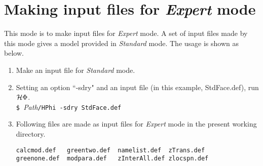 \section{Making input files for {\it Expert} mode}
This mode is to make input files for {\it Expert} mode. A set of input files made by this mode gives a model provided in {\it Standard} mode.
The usage is shown as below.
\begin{enumerate}
\item{Make an input file for {\it Standard} mode.}
\item{Setting an option ``-sdry" and an input file (in this example, StdFace.def), run $\mathcal{H} \Phi$.}\\
\verb|$ |\textit{Path}\verb|/HPhi -sdry StdFace.def|
\item{Following files are made as input files for {\it Expert} mode in the present working directory.}\\
\begin{minipage}{12cm}
\begin{screen}
\begin{verbatim}
calcmod.def   greentwo.def  namelist.def  zTrans.def
greenone.def  modpara.def   zInterAll.def zlocspn.def
\end{verbatim}
\end{screen}
\end{minipage}
\end{enumerate}
